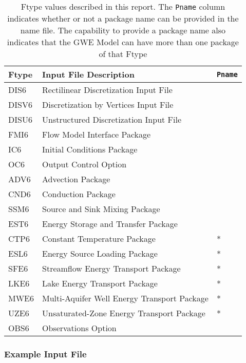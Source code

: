 \begin{table}[H]
\caption{Ftype values described in this report.  The \texttt{Pname} column indicates whether or not a package name can be provided in the name file.  The capability to provide a package name also indicates that the GWE Model can have more than one package of that Ftype}
\small
\begin{center}
\begin{tabular*}{\columnwidth}{l l l}
\hline
\hline
Ftype & Input File Description & \texttt{Pname}\\
\hline
DIS6 & Rectilinear Discretization Input File \\
DISV6 & Discretization by Vertices Input File \\
DISU6 & Unstructured Discretization Input File \\
FMI6 & Flow Model Interface Package &  \\ 
IC6 & Initial Conditions Package \\
OC6 & Output Control Option \\
ADV6 & Advection Package \\ 
CND6 & Conduction Package \\ 
SSM6 & Source and Sink Mixing Package \\ 
EST6 & Energy Storage and Transfer Package \\
CTP6 & Constant Temperature Package & * \\ 
ESL6 & Energy Source Loading Package & * \\
SFE6 & Streamflow Energy Transport Package & * \\
LKE6 & Lake Energy Transport Package & * \\
MWE6 & Multi-Aquifer Well Energy Transport Package & * \\
UZE6 & Unsaturated-Zone Energy Transport Package & * \\
OBS6 & Observations Option \\
\hline 
\end{tabular*}
\label{table:ftype}
\end{center}
\normalsize
\end{table}

\vspace{5mm}
\subsubsection{Example Input File}


